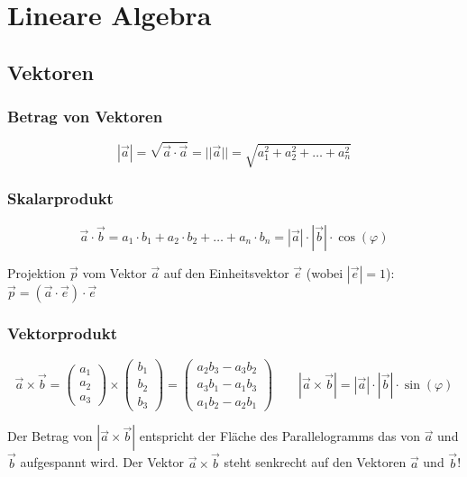 \section{Lineare Algebra}

\subsection{Vektoren}

\subsubsection{Betrag von Vektoren}
\[ 
	|\vec{a}| = \sqrt{\vec{a} \cdot \vec{a}} = ||\vec{a}|| =\sqrt{a_1^2 + a_2^2 + \ldots + a_n^2}
\]

	
\subsubsection{Skalarprodukt}
\[ 
	\vec{a} \cdot \vec{b} = a_1 \cdot b_1 + a_2 \cdot b_2 + \ldots +a_n \cdot b_n = |\vec{a}| \cdot |\vec{b}| \cdot \cos(\varphi)
\]
			
Projektion $\vec{p}$ vom Vektor $\vec{a}$ auf den Einheitsvektor $\vec{e}$ (wobei $|\vec{e}|=1$): \hspace{1cm} $\vec{p}=(\vec{a} \cdot \vec{e}) \cdot \vec{e}$


\subsubsection{Vektorprodukt}
\[
	\vec{a} \times \vec{b} = 
	\begin{pmatrix}a_1\\a_2\\a_3 \end{pmatrix} \times 
	\begin{pmatrix}b_1\\b_2\\b_3 \end{pmatrix} = 
	\begin{pmatrix}
	a_2 b_3 - a_3 b_2 \\ a_3 b_1 -  a_1 b_3 \\ a_1 b_2 - a_2 b_1 
	\end{pmatrix} \quad \quad 
	|\vec{a} \times \vec{b}|=|\vec{a}| \cdot |\vec{b}| \cdot
	\sin(\varphi)
\]

Der Betrag von $|\vec{a} \times \vec{b}|$ entspricht der Fläche des
Parallelogramms das von $\vec{a}$ und $\vec{b}$ aufgespannt wird. Der Vektor  $\vec{a} \times \vec{b}$ steht senkrecht auf den Vektoren $\vec{a}$ und $\vec{b}$!


